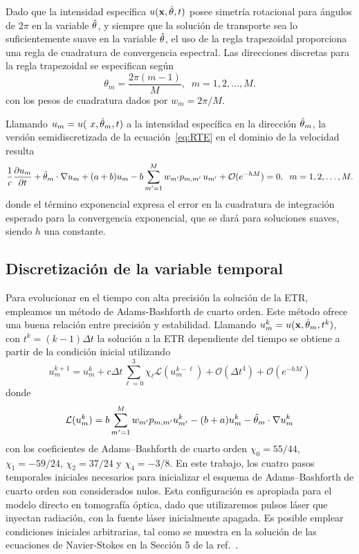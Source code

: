 Dado que la intensidad específica $u(\mathbf{x},\hat{\theta},t)$ posee simetría rotacional
para ángulos de $2\pi$ en la variable $\hat{\theta}$, y siempre que la solución de 
transporte sea lo suficientemente
suave en la variable $\hat{\theta}$, el uso de la regla trapezoidal 
proporciona una regla de cuadratura de convergencia espectral. 
Las direcciones discretas para la regla trapezoidal se especifican 
según
\begin{equation}
\theta_m=\frac{2\pi(m-1)}{M}, \; \; m=1,2,\ldots,M.
\label{eq:RTETrapz}
\end{equation}
con los pesos de cuadratura dados por $w_{m}=2\pi/M$.

Llamando  $ u_m= u (\ x, \hat{\theta}_m, t)$ a la intensidad específica 
en la dirección $\hat{\theta}_m$, la versión semidiscretizada de la 
ecuación~\eqref{eq:RTE} en el dominio de la velocidad resulta
\begin{equation*}
\frac{1}{c}  \frac{\partial  u_m}{\partial t}  
 + \hat{\theta}_m
\cdot  \nabla u_m + (a+b) u_m
-b\sum_{m'=1}^M w_{m'}
p_{m,m'} \, u_{m'}+\mathcal{O}(e^{-hM}) =0, \; \; m=1,2,\ldots,M.
\label{eq:RTEdom}
\end{equation*}
donde el término exponencial expresa el error en la cuadratura 
de integración esperado para la convergencia exponencial, que se dará 
para soluciones suaves, siendo $h$ una constante.
\subsection{Discretización de la variable temporal}
\label{sec:adamsbashforth}
Para evolucionar en el tiempo con alta precisión la solución de la ETR,
empleamos un método de Adams-Bashforth de cuarto orden. Este método ofrece una 
buena relación entre precisión y estabilidad.
Llamando $u_m^k=u(\mathbf{x},\hat{\theta}_m,t^k)$, con $t^{k}=(k-1)\Delta t$ la solución 
a la ETR 
dependiente del tiempo se obtiene a partir de la condición inicial utilizando
\begin{equation}
u_m^{k+1} =  u_m^k + c\Delta t \sum_{\ell=0}^3 \chi_{\ell} \mathcal{L} ( u^{k-\ell}_m)  
+\mathcal{O}(\Delta t^4)+\mathcal{O}(e^{-hM})
\label{eq:RTEAB4}
\end{equation}
donde
\begin{equation}
\mathcal{L} ( u_m^k) = b\sum_{m'=1}^{M} w_{m'} p_{m,m'} u_{m'}^k-(b+a)u_m^k-\hat{\theta}_m \cdot \nabla u_m^k \notag
\label{eq:RTEAB4L}
\end{equation}
con los coeficientes de Adams--Bashforth de cuarto orden $\chi_0=55/44$, 
$\chi_1=-59/24$, $\chi_2=37/24$ y $\chi_4=-3/8$. 
En este trabajo, los cuatro pasos temporales iniciales necesarios para inicializar 
el esquema de Adams--Bashforth de cuarto orden son considerados nulos. Esta configuración es 
apropiada para 
el modelo directo en tomografía óptica, dado que utilizaremos pulsos láser 
que inyectan radiación, con la fuente láser inicialmente apagada. Es posible 
emplear condiciones iniciales arbitrarias, tal como se muestra en 
la solución de las ecuaciones de Navier-Stokes en la Sección 5 de la ref.~\cite{Bruno2016}.

